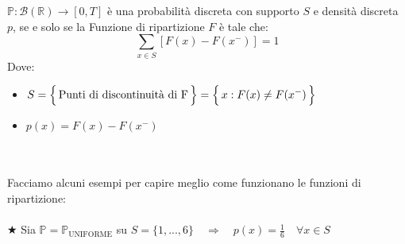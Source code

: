\begin{proposizione}
\label{prop:fdr}
    $\mathbb{P}:\mathcal{B}(\mathbb{R})\rightarrow[0, T]$ è una probabilità discreta con supporto $S$ e densità discreta $p$, se e solo se la Funzione di ripartizione $F$ è tale che:
    \[\sum_{x\in S}\left[F(x)-F(x^-)\right] = 1\]
    Dove:
    \begin{itemize}
        \item $S = \Bigl\{\,\text{Punti di discontinuità di F}\,\Bigr\} = \Bigl\{\,x:F(x)\neq F(x^-)\,\Bigr\}$
        \item $p(x) = F(x)-F(x^-)$
    \end{itemize}
\end{proposizione}
\bigskip
\noindent
{}\\
\\
\noindent Facciamo alcuni esempi per capire meglio come funzionano le funzioni di ripartizione:\\
\\ 
\noindent\(\bigstar\) Sia $\mathbb{P} = \mathbb{P}_{\text{UNIFORME}}$ su $S = \{1, ..., 6\} \quad \Rightarrow\quad p(x) = \frac{1}{6}\quad \forall x\in S$\\

